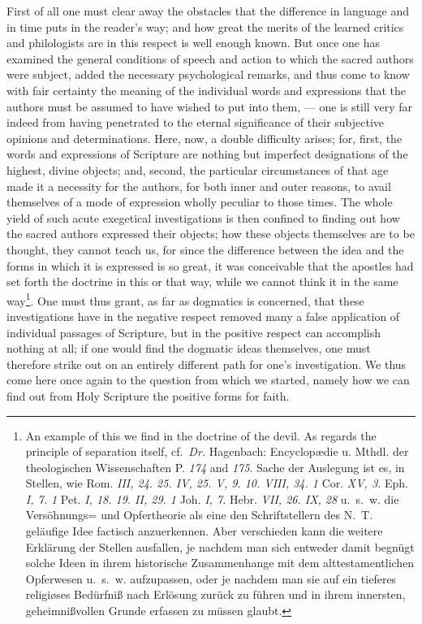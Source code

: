 \documentclass[12pt]{book}
\newcommand{\opage}[1]{\marginnote{\footnotesize\textit{[#1]}}}
\begin{document}
First of all one must clear away the obstacles that the difference in language
and in time puts in the reader's way; and how great the merits of the learned
critics and philologists are in this respect is well enough known. But once
one has examined the general conditions of speech and action to which the
sacred authors were subject, added the necessary psychological remarks, and
thus come to know with fair certainty the meaning of the individual words and
expressions
\opage{109} \setcounter{footnote}{0}%
that the authors must be assumed to have wished to put into them, --- one is
still very far indeed from having penetrated to the eternal significance of
their subjective opinions and determinations. Here, now, a double difficulty
arises; for, first, the words and expressions of Scripture are nothing but
imperfect designations of the highest, divine objects; and, second, the
particular circumstances of that age made it a necessity for the authors, for
both inner and outer reasons, to avail themselves of a mode of expression
wholly peculiar to those times. The whole yield of such acute exegetical
investigations is then confined to finding out how the sacred authors
expressed their objects; how these objects themselves are to be thought, they
cannot teach us, for since the difference between the idea and the forms in
which it is expressed is so great, it was conceivable that the apostles had
set forth the doctrine in this or that way, while we cannot think it in the
same way\footnote{An example of this we find in the doctrine of the devil. As
regards the principle of separation itself, cf.\ \textit{Dr.} Hagenbach:
Encyclopædie u. Mthdl. der theologischen Wissenschaften P. \textit{174} and
\textit{175}. Sache der Auslegung ist es, in Stellen, wie Rom. \textit{III,
24. 25. IV, 25. V, 9. 10. VIII, 34. 1} Cor. \textit{XV, 3.} Eph. \textit{I, 7.
1} Pet. \textit{I, 18. 19. II, 29. 1} Joh. \textit{I, 7.} Hebr. \textit{VII,
26. IX, 28} u.~s.~w. die Versöhnungs= und Opfertheorie als eine den
Schriftstellern des N.~T. geläufige Idee factisch anzuerkennen. Aber
verschieden kann die weitere Erklärung der Stellen ausfallen, je nachdem man
sich entweder damit begnügt solche Ideen in ihrem historische Zusammenhange
mit dem alttestamentlichen Opferwesen u.~s.~w. aufzupassen, oder je nachdem
man sie auf ein tieferes religiøses Bedürfniß nach Erlösung zurück zu führen
und in ihrem innersten, geheimnißvollen Grunde erfassen zu müssen glaubt.}.
One must thus grant, as far as dogmatics is concerned, that these
investigations have in the negative respect removed many a false
\opage{110} application of individual passages of Scripture, but in the
positive respect can accomplish nothing at all; if one would find the dogmatic
ideas themselves, one must therefore strike out on an entirely different path
for one's investigation. We thus come here once again to the question from
which we started, namely how we can find out from Holy Scripture the positive
forms for faith.
\end{document}
